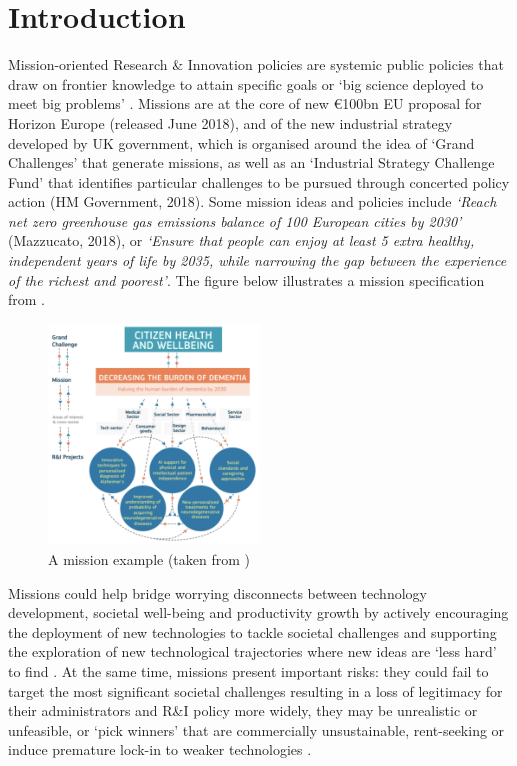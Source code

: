 \documentclass[11pt]{article}
\begin{document}
\section{Introduction}
\label{sec:introduction}

Mission-oriented Research \& Innovation policies are systemic public policies that draw on frontier knowledge to attain specific goals or `big science deployed to meet big problems' \citep{mazzucato_mission-oriented_2018}. Missions are at the core of new €100bn EU proposal for Horizon Europe (released June 2018), and of the new industrial strategy developed by UK government, which is organised around the idea of `Grand Challenges’ that generate missions, as well as an `Industrial Strategy Challenge Fund’ that identifies particular challenges to be pursued through concerted policy action (HM Government, 2018). Some mission ideas and policies include \textit{`Reach net zero greenhouse gas emissions balance of 100 European cities by 2030'} (Mazzucato, 2018), or \textit{`Ensure that people can enjoy at least 5 extra healthy, independent years of life by 2035, while narrowing the gap between the experience of the richest and poorest'}. The figure below illustrates a mission specification from \cite{mazzucato_mission-oriented_2018}.

\begin{figure}[!ht]
    \centering
    \includegraphics[width=0.5\textwidth]{figures/fig1_example.png}
    \caption{A mission example (taken from \cite{mazzucato_mission-oriented_2018})}
    \label{fig:mission_example}
\end{figure}

Missions could help bridge worrying disconnects between technology development, societal well-being and productivity growth by actively encouraging the deployment of new technologies to tackle societal challenges and supporting the exploration of new technological trajectories where new ideas are `less hard' to find \citep{bloom_are_2017, cantner_elements_2018}. At the same time, missions present important risks: they could fail to target the most significant societal challenges resulting in a loss of legitimacy for their administrators and R\&I policy more widely, they may be unrealistic or unfeasible, or `pick winners' that are commercially unsustainable, rent-seeking or induce premature lock-in to weaker technologies \citep{aghion_science_2009}. 
\end{document}
